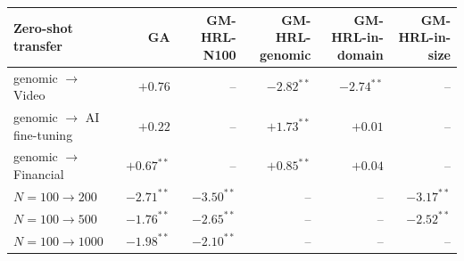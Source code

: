 \begin{tabular}{lrrrrr}
\toprule
Zero-shot transfer & GA & GM-HRL-N100 & GM-HRL-genomic & GM-HRL-in-domain & GM-HRL-in-size \\
\midrule
genomic $\to$ Video & $+0.76$ & -- & $-2.82^{**}$ & $-2.74^{**}$ & -- \\
genomic $\to$ AI fine-tuning & $+0.22$ & -- & $+1.73^{**}$ & $+0.01$ & -- \\
genomic $\to$ Financial & $+0.67^{**}$ & -- & $+0.85^{**}$ & $+0.04$ & -- \\
$N{=}100 \to 200$ & $-2.71^{**}$ & $-3.50^{**}$ & -- & -- & $-3.17^{**}$ \\
$N{=}100 \to 500$ & $-1.76^{**}$ & $-2.65^{**}$ & -- & -- & $-2.52^{**}$ \\
$N{=}100 \to 1000$ & $-1.98^{**}$ & $-2.10^{**}$ & -- & -- & -- \\
\bottomrule
\end{tabular}
